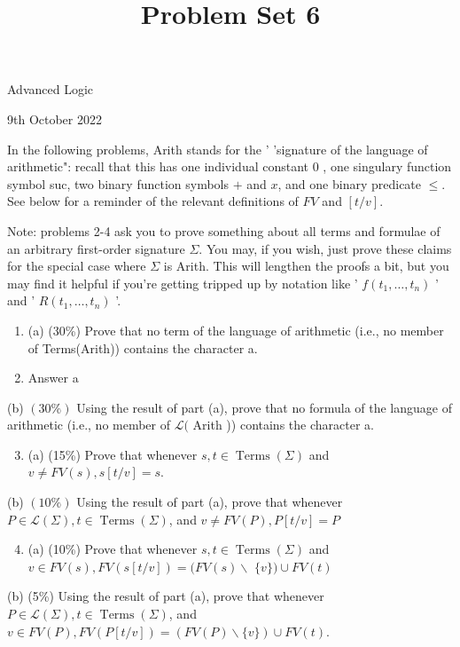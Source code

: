 \documentclass[10pt]{article}
\title{Problem Set 6 }
\author{}
\date{}
\begin{document}
\maketitle
Advanced Logic

9th October 2022

In the following problems, Arith stands for the ' 'signature of the language of arithmetic": recall that this has one individual constant 0 , one singulary function symbol suc, two binary function symbols $+$ and $x$, and one binary predicate $\leq$. See below for a reminder of the relevant definitions of $F V$ and $[t / v]$.

Note: problems 2-4 ask you to prove something about all terms and formulae of an arbitrary first-order signature $\Sigma$. You may, if you wish, just prove these claims for the special case where $\Sigma$ is Arith. This will lengthen the proofs a bit, but you may find it helpful if you're getting tripped up by notation like ' $f\left(t_{1}, \ldots, t_{n}\right)$ ' and ' $R\left(t_{1}, \ldots, t_{n}\right)$ '.

\begin{enumerate}
  \item (a) (30\%) Prove that no term of the language of arithmetic (i.e., no member of Terms(Arith)) contains the character a.
  \item Answer a
\end{enumerate}
(b) $(30 \%)$ Using the result of part (a), prove that no formula of the language of arithmetic (i.e., no member of $\mathcal{L}($ Arith )) contains the character a.

\begin{enumerate}
  \setcounter{enumi}{2}
  \item (a) (15\%) Prove that whenever $s, t \in \operatorname{Terms}(\Sigma)$ and $v \neq F V(s), s[t / v]=s$.
\end{enumerate}
(b) $(10 \%)$ Using the result of part (a), prove that whenever $P \in \mathcal{L}(\Sigma), t \in \operatorname{Terms}(\Sigma)$, and $v \neq F V(P), P[t / v]=P$

\begin{enumerate}
  \setcounter{enumi}{3}
  \item (a) (10\%) Prove that whenever $s, t \in \operatorname{Terms}(\Sigma)$ and $v \in F V(s), F V(s[t / v])=(F V(s) \backslash$ $\{v\}) \cup F V(t)$
\end{enumerate}
(b) (5\%) Using the result of part (a), prove that whenever $P \in \mathcal{L}(\Sigma), t \in \operatorname{Terms}(\Sigma)$, and $v \in F V(P), F V(P[t / v])=(F V(P) \backslash\{v\}) \cup F V(t)$.
\end{document}
